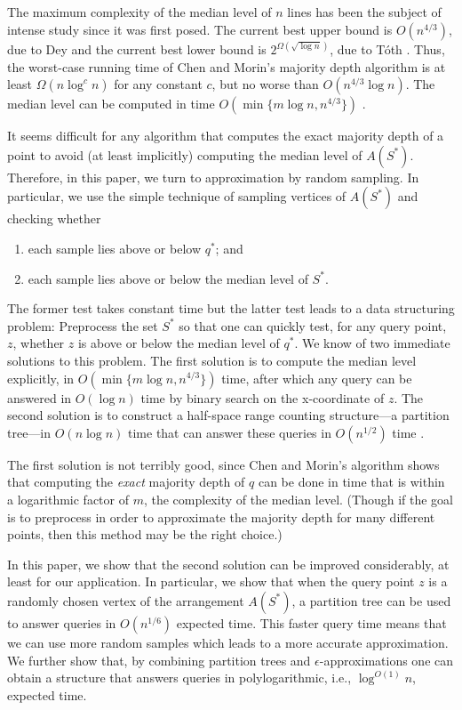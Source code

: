 \documentclass{patmorin}
\begin{document}
The maximum complexity of the median level of $n$ lines has been the
subject of intense study since it was first posed.  The current best
upper bound is $O(n^{4/3})$, due to Dey \cite{d98} and the current best
lower bound is $2^{\Omega(\sqrt{\log n})}$, due to T\'oth \cite{t00}.
Thus, the worst-case running time of Chen and Morin's majority depth
algorithm is at least $\Omega(n\log^c n)$ for any constant $c$, but
no worse than $O(n^{4/3}\log n)$.  The median level can be computed in
time $O(\min\{m\log n,n^{4/3}\})$ \cite{bj02,c99}.

It seems difficult for any algorithm that computes the exact majority
depth of a point to avoid (at least implicitly) computing the median
level of $A(S^*)$.  Therefore, in this paper, we turn to approximation by
random sampling.  In particular, we use the simple technique of sampling
vertices of $A(S^*)$ and checking whether
\begin{enumerate}
  \item each sample lies above or below $q^*$; and
  \item each sample lies above or below the median level of $S^*$.
\end{enumerate}

The former test takes constant time but the latter test leads to a
data structuring problem:  Preprocess the set $S^*$ so that one can
quickly test, for any query point, $z$, whether $z$ is above or below
the median level of $q^*$.   We know of two immediate solutions to this
problem.  The first solution is to compute the median level explicitly,
in $O(\min\{m\log n,n^{4/3}\})$ time, after which any query can be
answered in $O(\log n)$ time by binary search on the x-coordinate of
$z$.  The second solution is to construct a half-space range counting
structure---a partition tree---in $O(n\log n)$ time that can answer
these queries in $O(n^{1/2})$ time \cite{c12}.

The first solution is not terribly good, since Chen and Morin's algorithm
shows that computing the \emph{exact} majority depth of $q$ can be done
in time that is within a logarithmic factor of $m$, the complexity of
the median level.  (Though if the goal is to preprocess in order to
approximate the majority depth for many different points, then this
method may be the right choice.)

In this paper, we show that the second solution can be improved
considerably, at least for our application.  In particular, we show that
when the query point $z$ is a randomly chosen vertex of the arrangement
$A(S^*)$, a partition tree can be used to answer queries in $O(n^{1/6})$
expected time.  This faster query time means that we can use more random
samples which leads to a more accurate approximation.  We further show
that, by combining partition trees and $\epsilon$-approximations
\cite{c04} one can obtain a structure that answers queries in
polylogarithmic, i.e., $\log^{O(1)} n$, expected time.
\end{document}
